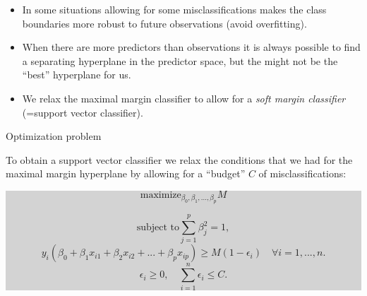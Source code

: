 \documentclass[10pt,ignorenonframetext,]{beamer}
\begin{document}
\begin{frame}

\begin{itemize}
\item
  In some situations allowing for some misclassifications makes the
  class boundaries more robust to future observations (avoid
  overfitting).
\item
  When there are more predictors than observations it is always possible
  to find a separating hyperplane in the predictor space, but the might
  not be the ``best'' hyperplane for us.
\item
  We relax the maximal margin classifier to allow for a \emph{soft
  margin classifier} (=support vector classifier).
\end{itemize}

\end{frame}

\begin{frame}

\begin{block}{Optimization problem}

\vspace{2mm}

To obtain a support vector classifier we relax the conditions that we
had for the maximal margin hyperplane by allowing for a ``budget'' \(C\)
of misclassifications: \vspace{2mm}

\colorbox{lightgray}{\begin{minipage}{10cm}
$$\mathrm{maximize}_{\beta_0,\beta_1,...,\beta_p}  M $$

$$\text{subject to} \sum_{j=1}^p \beta_j^2=1,$$
$$y_i(\beta_0+\beta_1 x_{i1}+\beta_2 x_{i2}+...+\beta_p x_{ip})\geq M(1-\epsilon_i) \quad  \forall i=1,...,n.$$
$$\epsilon_i\geq 0, \quad \sum_{i=1}^n \epsilon_i \leq C.$$
\end{minipage}}

\end{block}

\end{frame}
\end{document}
